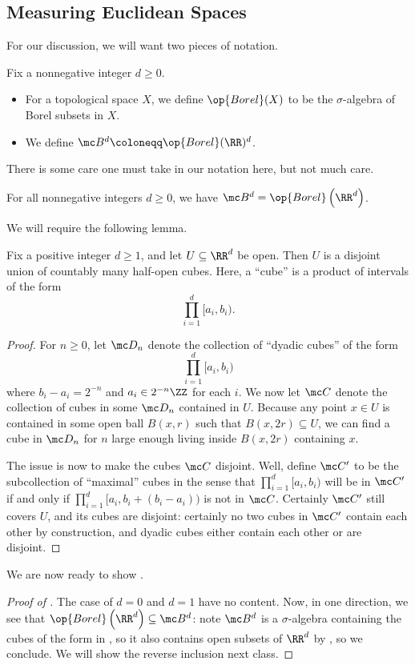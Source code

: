 \documentclass[../notes.tex]{subfiles}
\begin{document}
\subsection{Measuring Euclidean Spaces}
For our discussion, we will want two pieces of notation.
\begin{notation}
	Fix a nonnegative integer $d\ge0$.
	\begin{itemize}
		\item For a topological space $X$, we define $\op{Borel}(X)$ to be the $\sigma$-algebra of Borel subsets in $X$.
		\item We define $\mc B^d\coloneqq\op{Borel}(\RR)^d$.
	\end{itemize}
\end{notation}
There is some care one must take in our notation here, but not much care.
\begin{proposition} \label{prop:check-borel-product}
	For all nonnegative integers $d\ge0$, we have $\mc B^d=\op{Borel}\left(\RR^d\right)$.
\end{proposition}
We will require the following lemma.
\begin{lemma} \label{lem:divide-open-to-cubes}
	Fix a positive integer $d\ge1$, and let $U\subseteq\RR^d$ be open. Then $U$ is a disjoint union of countably many half-open cubes. Here, a ``cube'' is a product of intervals of the form
	\[\prod_{i=1}^d[a_i,b_i).\]
\end{lemma}
\begin{proof}
	For $n\ge0$, let $\mc D_n$ denote the collection of ``dyadic cubes'' of the form
	\[\prod_{i=1}^d[a_i,b_i)\]
	where $b_i-a_i=2^{-n}$ and $a_i\in2^{-n}\ZZ$ for each $i$. We now let $\mc C$ denote the collection of cubes in some $\mc D_n$ contained in $U$. Because any point $x\in U$ is contained in some open ball $B(x,r)$ such that $B(x,2r)\subseteq U$, we can find a cube in $\mc D_n$ for $n$ large enough living inside $B(x,2r)$ containing $x$.

	The issue is now to make the cubes $\mc C$ disjoint. Well, define $\mc C'$ to be the subcollection of ``maximal'' cubes in the sense that $\prod_{i=1}^d[a_i,b_i)$ will be in $\mc C'$ if and only if $\prod_{i=1}^d[a_i,b_i+(b_i-a_i))$ is not in $\mc C$. Certainly $\mc C'$ still covers $U$, and its cubes are disjoint: certainly no two cubes in $\mc C'$ contain each other by construction, and dyadic cubes either contain each other or are disjoint.
\end{proof}
We are now ready to show .
\begin{proof}[Proof of ]
	The case of $d=0$ and $d=1$ have no content. Now, in one direction, we see that $\op{Borel}\left(\RR^d\right)\subseteq\mc B^d$: note $\mc B^d$ is a $\sigma$-algebra containing the cubes of the form in , so it also contains open subsets of $\RR^d$ by , so we conclude. We will show the reverse inclusion next class.
\end{proof}
\end{document}
